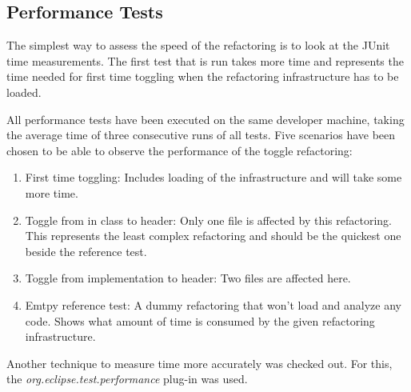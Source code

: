 \subsection{Performance Tests}
\label{performance}

The simplest way to assess the speed of the refactoring is to look at the JUnit
time measurements. The first test that is run takes more time and represents the 
time needed for first time toggling when the refactoring infrastructure has to 
be loaded. 

All performance tests have been executed on the same developer machine, taking
the average time of three consecutive runs of all tests. Five scenarios have
been chosen to be able to observe the performance of the toggle refactoring:

\begin{enumerate}
\item First time toggling: Includes loading of the infrastructure and will take 
some more time.
\item Toggle from in class to header: Only one file is affected by this 
refactoring. This represents the least complex refactoring and should be the 
quickest one beside the reference test.
\item Toggle from implementation to header: Two files are affected here.
\item Emtpy reference test: A dummy refactoring that won't load and analyze any 
code. Shows what amount of time is consumed by the given refactoring 
infrastructure.
\end{enumerate}

Another technique to measure time more accurately was checked out. For this, the 
\textit{org.eclipse.test.performance} plug-in was used.
